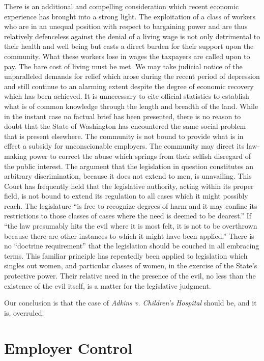\documentclass[
  letterpaper,
  11pt,
  DIV=9,
  openright]{scrbook}
\begin{document}
There is an additional and compelling consideration which recent
economic experience has brought into a strong light. The exploitation of
a class of workers who are in an unequal position with respect to
bargaining power and are thus relatively defenceless against the denial
of a living wage is not only detrimental to their health and well being
but casts a direct burden for their support upon the community. What
these workers lose in wages the taxpayers are called upon to pay. The
bare cost of living must be met. We may take judicial notice of the
unparalleled demands for relief which arose during the recent period of
depression and still continue to an alarming extent despite the degree
of economic recovery which has been achieved. It is unnecessary to cite
official statistics to establish what is of common knowledge through the
length and breadth of the land. While in the instant case no factual
brief has been presented, there is no reason to doubt that the State of
Washington has encountered the same social problem that is present
elsewhere. The community is not bound to provide what is in effect a
subsidy for unconscionable employers. The community may direct its
law-making power to correct the abuse which springs from their selfish
disregard of the public interest. The argument that the legislation in
question constitutes an arbitrary discrimination, because it does not
extend to men, is unavailing. This Court has frequently held that the
legislative authority, acting within its proper field, is not bound to
extend its regulation to all cases which it might possibly reach. The
legislature ``is free to recognize degrees of harm and it may confine
its restrictions to those classes of cases where the need is deemed to
be dearest.'' If ``the law presumably hits the evil where it is most
felt, it is not to be overthrown because there are other instances to
which it might have been applied.'' There is no ``doctrine requirement''
that the legislation should be couched in all embracing terms. This
familiar principle has repeatedly been applied to legislation which
singles out women, and particular classes of women, in the exercise of
the State's protective power. Their relative need in the presence of the
evil, no less than the existence of the evil itself, is a matter for the
legislative judgment.

Our conclusion is that the case of \emph{Adkins v. Children's Hospital}
should be, and it is, overruled.

\section{Employer Control}\label{employer-control}
\end{document}
